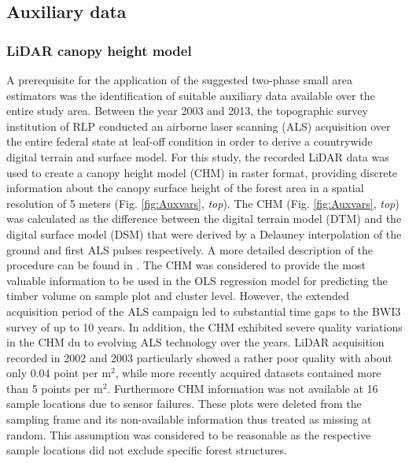 \subsection{Auxiliary data}
\label{sec:auxinfo}

\subsubsection{LiDAR canopy height model}
\label{sec:chm}

A prerequisite for the application of the suggested two-phase small area estimators was the identification of suitable auxiliary data available over the entire study area. Between the year 2003 and 2013, the topographic survey institution of RLP conducted an airborne laser scanning (ALS) acquisition over the entire federal state at leaf-off condition in order to derive a countrywide digital terrain and surface model. For this study, the recorded LiDAR data was used to create a canopy height model (CHM) in raster format, providing discrete information about the canopy surface height of the forest area in a spatial resolution of 5 meters (Fig. \ref{fig:Auxvars}, \textit{top}). The CHM (Fig. \ref{fig:Auxvars}, \textit{top}) was calculated as the difference between the digital terrain model (DTM) and the digital surface model (DSM) that were derived by a Delauney interpolation of the ground and first ALS pulses respectively. A more detailed description of the procedure can be found in \citet{hill2017a}. The CHM was considered to provide the most valuable information to be used in the OLS regression model for predicting the timber volume on sample plot and cluster level. However, the extended acquisition period of the ALS campaign led to substantial time gaps to the BWI3 survey of up to 10 years. In addition, the CHM exhibited severe quality variations in the CHM du to evolving ALS technology over the years. LiDAR acquisition recorded in 2002 and 2003 particularly showed a rather poor quality with about only 0.04 point per m$^2$, while more recently acquired datasets contained more than 5 points per m$^2$. Furthermore CHM information was not available at 16 sample locations due to sensor failures. These plots were deleted from the sampling frame and its non-available information thus treated as missing at random. This assumption was considered to be reasonable as the respective sample locations did not exclude specific forest structures.

